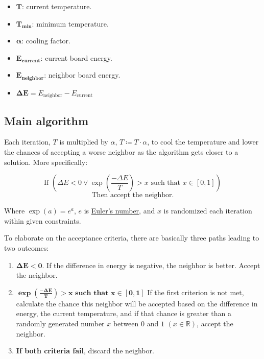 \documentclass{article}
\begin{document}
\begin{itemize}
    \item \(\boldsymbol{T}\): current temperature.
    \item \(\boldsymbol{T_{\mathbf{min}}}\): minimum temperature.
    \item \(\boldsymbol{\alpha}\): cooling factor.
    \item \(\boldsymbol{E_{\mathbf{current}}}\): current board energy.
    \item \(\boldsymbol{E_{\mathbf{neighbor}}}\): neighbor board energy.
    \item \(\boldsymbol{\Delta E} = E_{\text{neighbor}} - E_{\text{current}}\)
\end{itemize}

\subsection{Main algorithm}

Each iteration, \(T\) is multiplied by \(\alpha\), \(T \coloneqq T \cdot \alpha\),
to cool the temperature and lower the chances of accepting a worse neighbor as the algorithm gets closer to a solution. More specifically:

\[
    \text{If } \left(\Delta E < 0 \lor \exp\left(\frac{-\Delta E}{T}\right) > x \text{ such that } x \in [0, 1] \right)
\]
\[
    \text{Then accept the neighbor.}
\]

Where \( \exp(a) = e^a \), \( e \) is \href{https://en.wikipedia.org/wiki/E_(mathematical_constant)}{Euler's number},
and \( x \) is randomized each iteration within given constraints.

To elaborate on the acceptance criteria, there are basically three paths leading to two outcomes:

\begin{enumerate}
    \item \(\boldsymbol{\Delta E < 0}\). If the difference in energy is negative, the neighbor is better. Accept the neighbor.
    \item \(\boldsymbol{\exp\left(\frac{-\Delta E}{T}\right) > x \textbf{ such that } x \in [0, 1]}\)
          If the first criterion is not met, calculate the chance this neighbor will be accepted based on the difference in energy,
          the current temperature, and if that chance is greater than a randomly generated number \(x\) between \(0\) and \(1\) \((x \in \mathbb{R})\), accept the neighbor.
    \item \textbf{If both criteria fail}, discard the neighbor.
\end{enumerate}
\end{document}
